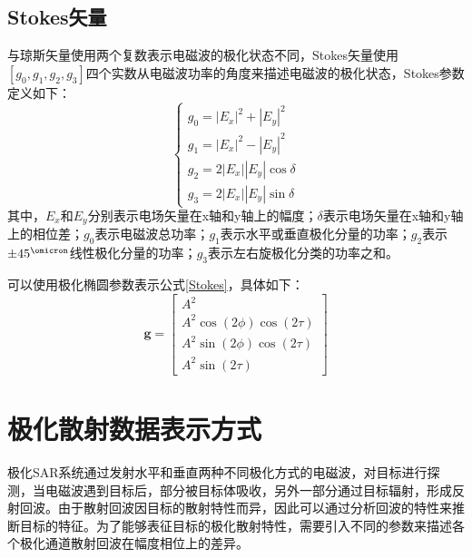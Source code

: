 \subsection{Stokes矢量}
与琼斯矢量使用两个复数表示电磁波的极化状态不同，Stokes矢量使用$[g_0,g_1,g_2,g_3]$四个实数从电磁波功率的角度来描述电磁波的极化状态，Stokes参数定义如下：
\begin{equation}
    \label{Stokes}
    \left\{\begin{array}{l}
        g_0=\left|E_x\right|^2+\left|E_y\right|^2         \\
        g_1=\left|E_x\right|^2-\left|E_y\right|^2         \\
        g_2=2\left|E_x\right|\left|E_y\right| \cos \delta \\
        g_3=2\left|E_x\right|\left|E_y\right| \sin \delta
    \end{array}\right.
\end{equation}
其中，$E_x$和$E_y$分别表示电场矢量在x轴和y轴上的幅度；$\delta$表示电场矢量在x轴和y轴上的相位差；$g_0$表示电磁波总功率；$g_1$表示水平或垂直极化分量的功率；$g_2$表示$\pm 45^{\operatorname{\omicron}}$线性极化分量的功率；$g_3$表示左右旋极化分类的功率之和。

可以使用极化椭圆参数表示公式\eqref{Stokes}，具体如下：
\begin{equation}
    \boldsymbol{g}=\left[\begin{array}{c}
            A^2                             \\
            A^2 \cos (2 \phi) \cos (2 \tau) \\
            A^2 \sin (2 \phi) \cos (2 \tau) \\
            A^2 \sin (2 \tau)
        \end{array}\right]
\end{equation}

\section{极化散射数据表示方式}
极化SAR系统通过发射水平和垂直两种不同极化方式的电磁波，对目标进行探测，当电磁波遇到目标后，部分被目标体吸收，另外一部分通过目标辐射，形成反射回波。由于散射回波因目标的散射特性而异，因此可以通过分析回波的特性来推断目标的特征。为了能够表征目标的极化散射特性，需要引入不同的参数来描述各个极化通道散射回波在幅度相位上的差异。
